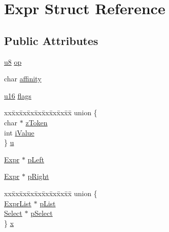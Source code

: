 \hypertarget{struct_expr}{\section{Expr Struct Reference}
\label{struct_expr}
}
\subsection*{Public Attributes}
\begin{DoxyCompactItemize}
\item 
\hyperlink{sqlite3_8c_a74a0f6424ae628af25f23f0a35f6ead3}{u8} \hyperlink{struct_expr_a101c55ddb6c149d95f0327831eb78225}{op}
\item 
char \hyperlink{struct_expr_aeb51b76e606d6fbae234e38473bf3dc9}{affinity}
\item 
\hyperlink{sqlite3_8c_a20f2299e322dcbde37cb07b16910b843}{u16} \hyperlink{struct_expr_ad6013561807a4a5182ce928f263bc3bf}{flags}
\item 
\begin{tabbing}
xx\=xx\=xx\=xx\=xx\=xx\=xx\=xx\=xx\=\kill
union \{\\
\>char $\ast$ \hyperlink{struct_expr_af1f6b0c5fcfdd18a41f682b74e13c950}{zToken}\\
\>int \hyperlink{struct_expr_a9ea4dff760e0008488807701c6102605}{iValue}\\
\} \hyperlink{struct_expr_a5a43a51aa0ee7afc9babcdc337dd77db}{u}\\

\end{tabbing}\item 
\hyperlink{struct_expr}{Expr} $\ast$ \hyperlink{struct_expr_a0a78282ae0d696f4a25013a12e38b1ba}{p\-Left}
\item 
\hyperlink{struct_expr}{Expr} $\ast$ \hyperlink{struct_expr_aa08c218d5b0b6f8882e8bf9ec8822a08}{p\-Right}
\item 
\begin{tabbing}
xx\=xx\=xx\=xx\=xx\=xx\=xx\=xx\=xx\=\kill
union \{\\
\>\hyperlink{struct_expr_list}{ExprList} $\ast$ \hyperlink{struct_expr_ac7107bf192a8080b919350925cc35dd8}{pList}\\
\>\hyperlink{struct_select}{Select} $\ast$ \hyperlink{struct_expr_a54e5186fdf157f8b4ae178919d8ff6b3}{pSelect}\\
\} \hyperlink{struct_expr_a9ff6313055718299e20a19e551dcbf0a}{x}\\


\end{tabbing}
\end{DoxyCompactItemize}

